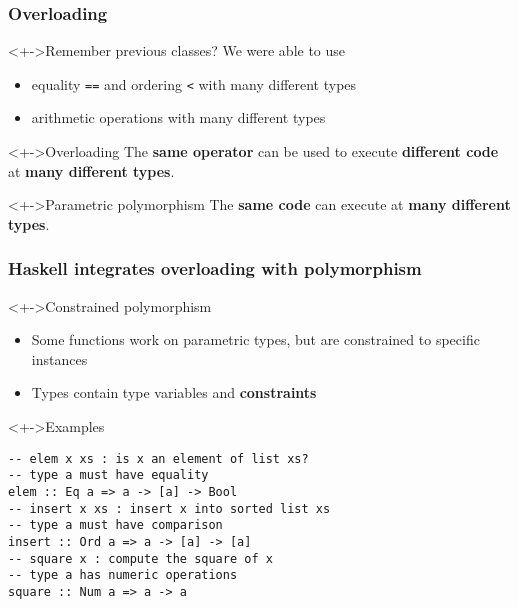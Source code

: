 \documentclass{beamer}
\subtitle{Type Classes --- Overloading in Haskell}
\begin{document}
\begin{frame}
  \titlepage
\end{frame}
\begin{frame}[fragile]
  \frametitle{Overloading}
  \begin{block}<+->{Remember previous classes?}
    We were able to use
    \begin{itemize}
    \item equality \texttt{==} and ordering \texttt{<} with many different types
    \item arithmetic operations with many different types
    \end{itemize}
  \end{block}
  \begin{block}<+->{Overloading}
    The \textbf{same operator} can be used to execute \textbf{different code} at \textbf{many different types}. 
  \end{block}
  \begin{block}<+->{Parametric polymorphism}
    The \textbf{same code} can execute at \textbf{many different types}.
  \end{block}
\end{frame}
\begin{frame}[fragile]
  \frametitle{Haskell integrates overloading with polymorphism}
  \begin{block}<+->{Constrained polymorphism}
    \begin{itemize}
    \item Some functions work on parametric types, but are constrained to specific instances
    \item Types contain type variables and \textbf{constraints}
    \end{itemize}
  \end{block}
  \begin{block}<+->{Examples}
\begin{lstlisting}
-- elem x xs : is x an element of list xs?
-- type a must have equality
elem :: Eq a => a -> [a] -> Bool
-- insert x xs : insert x into sorted list xs
-- type a must have comparison
insert :: Ord a => a -> [a] -> [a]
-- square x : compute the square of x
-- type a has numeric operations
square :: Num a => a -> a
\end{lstlisting}
  \end{block}
\end{frame}
\end{document}
